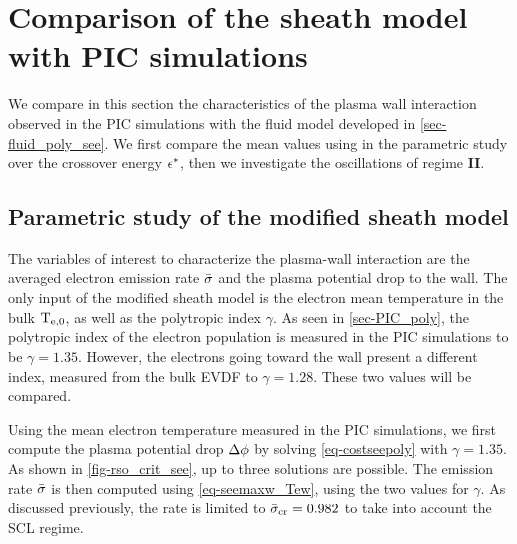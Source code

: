 

\section{Comparison of the sheath model with PIC simulations} \label{subsec-picandmodel}

  We compare in this section the characteristics of the plasma wall interaction observed in the \ac{PIC} simulations with the fluid model developed in \cref{sec-fluid_poly_see}.
  We first compare the mean values using in the parametric study over the crossover energy $\epsilon^{*}$, then we investigate the oscillations of regime {\bf II}.

  \subsection{Parametric study of the modified sheath model} \label{subsec-param_sheath_see}

    The variables of interest to characterize the plasma-wall interaction are the averaged electron emission rate $ \bar{\sigma }$ and the plasma potential drop to the wall.
    The only input of the modified sheath model is the electron mean temperature in the bulk $\mathrm{T_{e, 0}}$, as well as the polytropic index $\gamma$.
    As seen in \cref{sec-PIC_poly}, the polytropic index of the electron population is measured in the \ac{PIC} simulations to be $\gamma=1.35$.
    However, the electrons going toward the wall present a different index, measured from the bulk \ac{EVDF} to $\gamma=1.28$.
    These two values will be compared.

    Using the mean electron temperature measured in the \ac{PIC} simulations, we first compute the plasma potential drop $\Delta \phi$ by solving \cref{eq-costseepoly} with $\gamma=1.35$.
    As shown in \cref{fig-rso_crit_see}, up to three solutions are possible.
    The emission rate $ \bar{\sigma }$ is then computed using \cref{eq-seemaxw_Tew}, using the two values for $\gamma$.
    As discussed previously, the rate is limited to $ \bar{\sigma }_{\rm cr}=0.982$ to take into account the \ac{SCL} regime.

